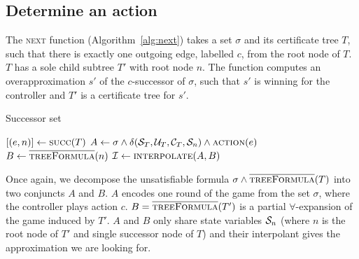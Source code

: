 \subsection{Determine an action}

The \textsc{next} function (Algorithm~\ref{alg:next}) takes a set $\sigma$ and its certificate tree $T$, such that there is exactly one outgoing edge, labelled $c$, from the root node of $T$.  $T$ has a sole child subtree $T'$ with root node $n$.  The function computes an overapproximation $s'$ of the $c$-successor of $\sigma$, such that $s'$ is winning for the controller and $T'$ is a certificate tree for $s'$.

\begin{algorithm}
   \caption{Successor set}\label{alg:next}
   \begin{algorithmic}[1]
        \State $[(e, n)] \gets \Call{succ}{T}$ 
            \State $A \gets \sigma \land \delta(\cS_T, \cU_T, \cC_T, \cS_n) \land \Call{action}{e}$\label{alg:strat:partition:Ai}
            \State $B \gets \textsc{$\overline{\mbox{treeFormula}}$}(n) $\label{alg:strat:partition:Bi}
            \State $\mathcal{I} \gets \Call{interpolate}{A, B}$ \label{alg:strat:partition:I}
            \State {} \label{alg:strat:partition:return}
        \EndFunction
    \end{algorithmic}
\end{algorithm}

Once again, we decompose the unsatisfiable formula $\sigma \land \textsc{$\overline{\mbox{treeFormula}}$}(T)$ into two conjuncts $A$ and $B$.  $A$ encodes one round of the game from the set $\sigma$, where the controller plays action $c$.  $B = \textsc{$\overline{\mbox{treeFormula}}$}(T')$ is a partial $\forall$-expansion of the game induced by $T'$.  $A$ and $B$ only share state variables $\mathcal{S}_n$ (where $n$ is the root node of $T'$ and single successor node of $T$) and their interpolant gives the approximation we are looking for.

